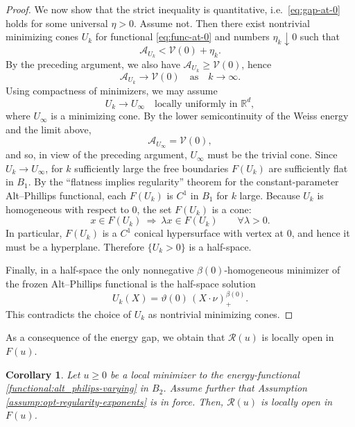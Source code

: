 \documentclass[reqno,11pt]{amsart}
\newtheorem{corollary}{Corollary}[section]
\newcommand{\1}{\mathds{1}}  %
\numberwithin{equation}{section}
\begin{document}
\begin{proof}
We now show that the strict inequality is quantitative, i.e.\ \eqref{eq:gap-at-0} holds for some universal $\eta>0$. Assume not. Then there exist nontrivial minimizing cones $U_k$ for functional \eqref{eq:func-at-0} and numbers $\eta_k\downarrow 0$ such that
\[
    \mathcal{A}_{U_k} < \mathcal{V}(0) + \eta_k.
\]
By the preceding argument, we also have $\mathcal{A}_{U_k}\ge \mathcal{V}(0)$, hence
\[
    \mathcal{A}_{U_k}\to \mathcal{V}(0) \quad \text{as} \quad k \to \infty.
\]
Using compactness of minimizers, we may assume
\[
    U_k\to U_\infty \quad \text{locally uniformly in }\mathbb{R}^d,
\]
where $U_\infty$ is a minimizing cone. By the lower semicontinuity of the Weiss energy and the limit above,
\[
    \mathcal{A}_{U_\infty}=\mathcal{V}(0),
\]
and so, in view of the preceding argument, $U_\infty$ must be the trivial cone. Since $U_k\to U_\infty$, for $k$ sufficiently large the free boundaries $F(U_k)$ are sufficiently flat in $B_1$. By the ``flatness implies regularity'' theorem for the constant-parameter Alt--Phillips functional, each $F(U_k)$ is $C^{1}$ in $B_1$ for $k$ large. Because $U_k$ is homogeneous with respect to $0$, the set $F(U_k)$ is a cone:
\[
    x\in F(U_k)\ \Longrightarrow\ \lambda x\in F(U_k)\qquad \forall \lambda>0.
\]
In particular, $F(U_k)$ is a $C^{1}$ conical hypersurface with vertex at $0$, and hence it must be a hyperplane. 
Therefore $\{U_k>0\}$ is a half-space.

Finally, in a half-space the only nonnegative $\beta(0)$-homogeneous minimizer of the frozen Alt--Phillips functional is the half-space solution
\[
    U_k(X)=\vartheta(0)\,(X\cdot \nu)_+^{\beta(0)}.
\]
This contradicts the choice of $U_k$ as nontrivial minimizing cones. 
\end{proof}

As a consequence of the energy gap, we obtain that $\mathcal{R}(u)$ is locally open in $F(u)$.

\begin{corollary}
Let $u \geq 0$ be a local minimizer to the energy-functional \eqref{functional:alt_philips-varying} in $B_2$. Assume further that Assumption \eqref{assump:opt-regularity-exponents} is in force. Then, $\mathcal{R}(u)$ is locally open in $F(u)$.
\end{corollary}
\end{document}
